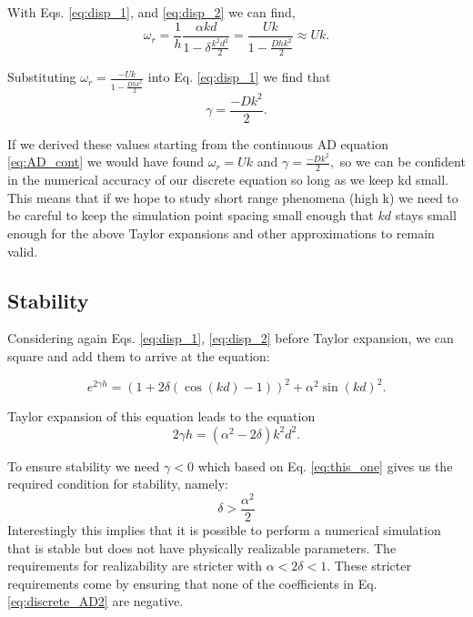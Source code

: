 \documentclass[]{article}
\begin{document}
With Eqs. \ref{eq:disp_1}, and \ref{eq:disp_2} we can find,
\begin{equation}
	\omega_r = \frac{1}{h}\frac{\alpha k d}{1-\delta \frac{k^2d^2}{2}} = \frac{Uk}{1-\frac{Dhk^2}{2}} \approx Uk.
\end{equation}

Substituting $\omega_r = \frac{-Uk}{1-\frac{Dhk^2}{2}} $ into Eq. \ref{eq:disp_1} we find that
\begin{equation}
\gamma = \frac{-Dk^2}{2}.
\end{equation}

If we derived these values starting from the continuous AD equation \ref{eq:AD_cont} we would have found $\omega_r = Uk$ and $\gamma =  \frac{-Dk^2}{2},$ so we can be confident in the numerical accuracy of our discrete equation so long as we keep kd small. This means that if we hope to study short range phenomena (high k) we need to be careful to keep the simulation point spacing small enough that $kd$ stays small enough for the above Taylor expansions and other approximations to remain valid. 

\subsection{Stability}
Considering again Eqs. \ref{eq:disp_1}, \ref{eq:disp_2} before Taylor expansion, we can square and add them to arrive at the equation:

\begin{equation}
e^{2\gamma h} = (1+2\delta(\cos(kd)-1))^2 + \alpha^2\sin(kd)^2.
\end{equation}

Taylor expansion of this equation leads to the equation
\begin{equation}
2\gamma h = (\alpha^2 - 2\delta)k^2d^2.
\label{eq:this_one}
\end{equation}

To ensure stability we need $\gamma <0$ which based on Eq. \ref{eq:this_one} gives us the required condition for stability, namely:
\begin{equation}
\delta > \frac{\alpha^2}{2}
\end{equation}
Interestingly this implies that it is possible to perform a numerical simulation that is stable but does not have physically realizable parameters. The requirements for realizability are stricter with $\alpha < 2\delta < 1$. These stricter requirements come by ensuring that none of the coefficients in Eq. \ref{eq:discrete_AD2} are negative.
\end{document}
